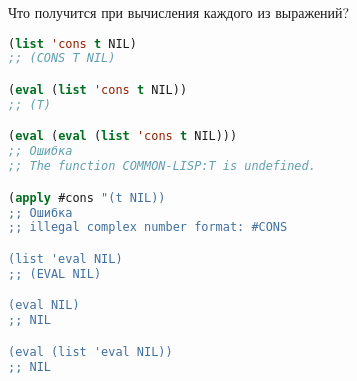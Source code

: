 Что получится при вычисления каждого из выражений?

\begin{lstlisting}[language=Lisp]
(list 'cons t NIL)
;; (CONS T NIL)

(eval (list 'cons t NIL))
;; (T)

(eval (eval (list 'cons t NIL)))
;; Ошибка
;; The function COMMON-LISP:T is undefined.

(apply #cons "(t NIL))
;; Ошибка
;; illegal complex number format: #CONS

(list 'eval NIL)
;; (EVAL NIL)

(eval NIL)
;; NIL

(eval (list 'eval NIL))
;; NIL
\end{lstlisting}

